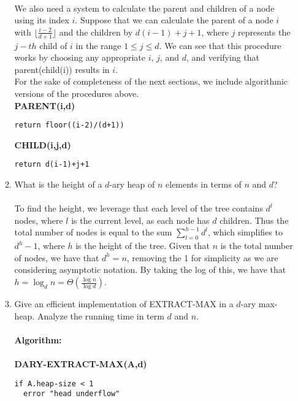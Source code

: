 \documentclass{article}
\begin{document}
\begin{enumerate}
\begin{enumerate}
\\ We also need a system to calculate the parent and children of a node using its index $i$. Suppose that we can calculate the parent of a node $i$ with $\lfloor  \frac{i-2}{d+1} \rfloor$ and the children by $d(i-1)+j+1$, where $j$ represents the $j-th$ child of $i$ in the range $1\leq j \leq d$. We can see that this procedure works by choosing any appropriate $i$, $j$, and $d$, and verifying that parent(child(i)) results in $i$.
\\ For the sake of completeness of the next sections, we include algorithmic versions of the procedures above.
\\ \textbf{PARENT(i,d)}
\begin{lstlisting}
return floor((i-2)/(d+1))
\end{lstlisting}
\textbf{CHILD(i,j,d)}
\begin{lstlisting}
return d(i-1)+j+1
\end{lstlisting}
		\item What is the height of a $d$-ary heap of $n$ elements in terms of $n$ and $d$?
\\\\ To find the height, we leverage that each level of the tree contains $d^l$ nodes, where $l$ is the current level, as each node has $d$ children. Thus the total number of nodes is equal to the sum $\sum_{l=0}^{h-1}d^l$, which simplifies to $d^h-1$, where $h$ is the height of the tree. Given that $n$ is the total number of nodes, we have that $d^h=n$, removing the 1 for simplicity as we are considering asymptotic notation. By taking the log of this, we have that $h=\log_dn= \Theta(\frac{\log n}{\log d})$.
		\item Give an efficient implementation of EXTRACT-MAX in a $d$-ary max-heap. Analyze the running time in term $d$ and $n$.
\\\\ \textbf{Algorithm:} 
\\\\ \textbf{DARY-EXTRACT-MAX(A,d)}
\begin{lstlisting}
if A.heap-size < 1
  error "head underflow"


\end{lstlisting}
\end{enumerate}
\end{enumerate}
\end{document}
